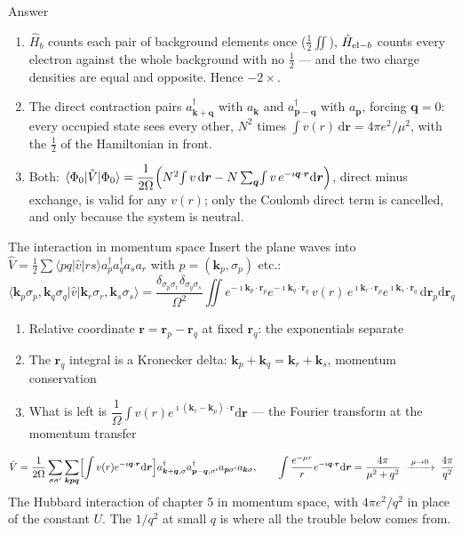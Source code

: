 \documentclass[aspectratio=169,10pt]{beamer}
\newcounter{thinkctr}
\newcommand{\thinka}[1]{%
  \vfill
  \begin{tcolorbox}[enhanced,colback=paleteal,colframe=teal,boxrule=1.2pt,arc=4pt,
    grow to left by=6mm,grow to right by=6mm,
    left=16pt,right=16pt,top=16pt,bottom=18pt,
    fonttitle=\bfseries\Large,fontupper=\large,
    title={Answer to pause \#\thethinkctr}]
  #1
  \end{tcolorbox}
  \vfill}
\newcommand{\element}[3]{\langle #1\vert #2\vert #3\rangle}
\newcommand{\ad}[1]{a_{#1}^{\dagger}}
\newcommand{\dd}{\mathrm{d}}
\begin{document}
\begin{frame}{Answer}
  \thinka{
  \begin{enumerate}
    \item $\hat H_b$ counts each pair of background elements once ($\tfrac12\iint$), $\hat H_{{\rm el}-b}$ counts every electron against the whole background with no $\tfrac12$ --- and the two charge densities are equal and opposite. Hence $-2\times$.
    \item The direct contraction pairs $\ad{\bm k+\bm q}$ with $a_{\bm k}$ and $\ad{\bm p-\bm q}$ with $a_{\bm p}$, forcing $\bm q=0$: every occupied state sees every other, $N^2$ times $\int v(r)\,\dd\bm r=4\pi e^2/\mu^2$, with the $\tfrac12$ of the Hamiltonian in front.
    \item Both: $\element{\Phi_0}{\hat V}{\Phi_0}=\dfrac{1}{2\Omega}\Bigl(N^2\!\int v\,\dd\bm r-N\sum_{\bm q}\!\int v\,e^{-\imath\bm q\cdot\bm r}\dd\bm r\Bigr)$, direct minus exchange, is valid for any $v(r)$; only the Coulomb direct term is cancelled, and only because the system is neutral.
  \end{enumerate}}
\end{frame}

\begin{frame}{The interaction in momentum space}
  \small
  Insert the plane waves into $\hat V=\frac12\sum\element{pq}{\hat v}{rs}\ad p\ad q a_sa_r$ with $p=(\bm k_p,\sigma_p)$ etc.:
  \[
    \element{\bm k_p\sigma_p,\bm k_q\sigma_q}{\hat v}{\bm k_r\sigma_r,\bm k_s\sigma_s}
    =\frac{\delta_{\sigma_p\sigma_r}\delta_{\sigma_q\sigma_s}}{\Omega^2}
    \iint e^{-\imath\bm k_p\cdot\bm r_p}e^{-\imath\bm k_q\cdot\bm r_q}\,v(r)\,e^{\imath\bm k_r\cdot\bm r_p}e^{\imath\bm k_s\cdot\bm r_q}\,\dd\bm r_p\dd\bm r_q
  \]
  \begin{enumerate}
    \item Relative coordinate $\bm r=\bm r_p-\bm r_q$ at fixed $\bm r_q$: the exponentials separate
    \item The $\bm r_q$ integral is a Kronecker delta: \alert{$\bm k_p+\bm k_q=\bm k_r+\bm k_s$}, momentum conservation
    \item What is left is $\dfrac{1}{\Omega}\displaystyle\int v(r)e^{\imath(\bm k_r-\bm k_p)\cdot\bm r}\dd\bm r$ --- the Fourier transform at the momentum transfer
  \end{enumerate}
  \[
    \hat V=\frac{1}{2\Omega}\sum_{\sigma\sigma'}\sum_{\bm k\bm p\bm q}\Bigl[\int v(r)e^{-\imath\bm q\cdot\bm r}\dd\bm r\Bigr]
    \ad{\bm k+\bm q,\sigma}\ad{\bm p-\bm q,\sigma'}a_{\bm p\sigma'}a_{\bm k\sigma},
    \qquad
    \int\frac{e^{-\mu r}}{r}e^{-\imath\bm q\cdot\bm r}\dd\bm r=\frac{4\pi}{\mu^2+q^2}\;\xrightarrow{\;\mu\to0\;}\;\frac{4\pi}{q^2}
  \]
  \centering\small The Hubbard interaction of chapter 5 in momentum space, with $4\pi e^2/q^2$ in place of the constant $U$. The $1/q^2$ at small $q$ is where all the trouble below comes from.
\end{frame}
\end{document}
